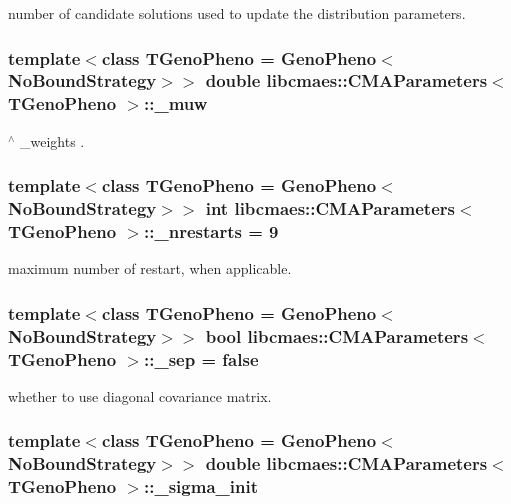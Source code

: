 number of candidate solutions used to update the distribution parameters. \hypertarget{classlibcmaes_1_1CMAParameters_afc24dfb50427ae6963515f8508f5759d}{
\subsubsection[{\-\_\-muw}]{\setlength{\rightskip}{0pt plus 5cm}template$<$class T\-Geno\-Pheno = Geno\-Pheno$<$\-No\-Bound\-Strategy$>$$>$ double {\bf libcmaes\-::\-C\-M\-A\-Parameters}$<$ T\-Geno\-Pheno $>$\-::\-\_\-muw}}\label{classlibcmaes_1_1CMAParameters_afc24dfb50427ae6963515f8508f5759d}
$^\wedge$ \-\_\-weights . \hypertarget{classlibcmaes_1_1CMAParameters_a2ccf2865600fe20d965af9bdf9c6ab60}{
\subsubsection[{\-\_\-nrestarts}]{\setlength{\rightskip}{0pt plus 5cm}template$<$class T\-Geno\-Pheno = Geno\-Pheno$<$\-No\-Bound\-Strategy$>$$>$ int {\bf libcmaes\-::\-C\-M\-A\-Parameters}$<$ T\-Geno\-Pheno $>$\-::\-\_\-nrestarts = 9}}\label{classlibcmaes_1_1CMAParameters_a2ccf2865600fe20d965af9bdf9c6ab60}
maximum number of restart, when applicable. \hypertarget{classlibcmaes_1_1CMAParameters_ad7f26f864149ce4d62169e15daa530fa}{
\subsubsection[{\-\_\-sep}]{\setlength{\rightskip}{0pt plus 5cm}template$<$class T\-Geno\-Pheno = Geno\-Pheno$<$\-No\-Bound\-Strategy$>$$>$ bool {\bf libcmaes\-::\-C\-M\-A\-Parameters}$<$ T\-Geno\-Pheno $>$\-::\-\_\-sep = false}}\label{classlibcmaes_1_1CMAParameters_ad7f26f864149ce4d62169e15daa530fa}
whether to use diagonal covariance matrix. \hypertarget{classlibcmaes_1_1CMAParameters_a8ad9eb52bd8ffcfc4ea175fef21c8f96}{
\subsubsection[{\-\_\-sigma\-\_\-init}]{\setlength{\rightskip}{0pt plus 5cm}template$<$class T\-Geno\-Pheno = Geno\-Pheno$<$\-No\-Bound\-Strategy$>$$>$ double {\bf libcmaes\-::\-C\-M\-A\-Parameters}$<$ T\-Geno\-Pheno $>$\-::\-\_\-sigma\-\_\-init}}\label{classlibcmaes_1_1CMAParameters_a8ad9eb52bd8ffcfc4ea175fef21c8f96}
